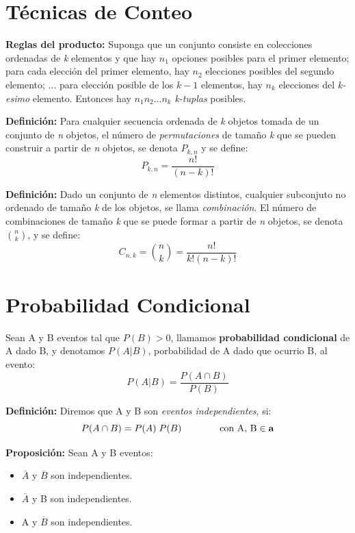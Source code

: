 \documentclass[12pt,a4paper]{report}
\begin{document}
	\section{Técnicas de Conteo}
		\par \textbf{Reglas del producto:} Suponga que un conjunto consiste en colecciones ordenadas de \textit{k} elementos y que hay $n_{1}$ opciones posibles para el primer elemento; para cada elección del primer elemento, hay $n_{2}$ elecciones posibles del segundo elemento; $\dotsc$ para elección posible de los $k - 1$ elementos, hay $n_{k}$ elecciones del \textit{k-esimo} elemento. Entonces hay $n_{1} n_{2} \dotsc n_{k}$ \textit{k-tuplas} posibles.
		
		\vspace{3mm}
		\par \textbf{Definición:} Para cualquier secuencia ordenada de \textit{k} objetos tomada de un conjunto de \textit{n} objetos, el número de \textit{permutaciones} de tamaño \textit{k} que se pueden construir a partir de \textit{n} objetos, se denota $P_{k, n}$ y se define:
		\[
			P_{k, n} = \frac{n!}{(n-k)!}
		\]
		
		\vspace{3mm}
		\par \textbf{Definición:} Dado un conjunto de \textit{n} elementos distintos, cualquier subconjuto no ordenado de tamaño \textit{k} de los objetos, se llama \textit{combinación}. El número de combinaciones de tamaño \textit{k} que se puede formar a partir de \textit{n} objetos, se denota ${n \choose k} $, y se define:
		\[
			C_{n, k} = {n \choose k}  = \frac{n!}{k! (n-k)!}
		\]
		
		
	\section{Probabilidad Condicional}
		\par Sean A y B eventos tal que $P(B) > 0$, llamamos \textbf{probabilidad condicional} de A dado B, y denotamos $P(A | B)$, porbabilidad de A dado que ocurrio B, al evento:
		\[
			P(A | B) = \frac{P(A \cap B)}{P(B)}
		\]
		
		\vspace{3mm}
		\par \textbf{Definición:} Diremos que A y B son \textit{eventos independientes}, si:
		\[
			P(A \cap B) = P(A) \; P(B) \qquad\qquad \textup{con A, B} \in \textbf{a}
		\]
	
		\vspace{3mm}
		\par \textbf{Proposición:} Sean A y B eventos:
		\begin{itemize}
			\item $\overline{A}$ y $\overline{B}$ son independientes.
			\item $\overline{A}$ y B son independientes.
			\item A y $\overline{B}$ son independientes.
		\end{itemize}
		
\end{document}

